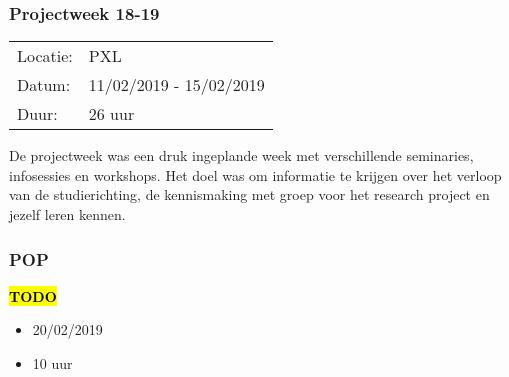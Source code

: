 \subsubsection{Projectweek 18-19}

\begin{tabular}{l l}
  Locatie: & PXL\\
  Datum: & 11/02/2019 - 15/02/2019\\
  Duur: & 26 uur
\end{tabular}

De projectweek was een druk ingeplande week met verschillende seminaries, infosessies en workshops. Het doel was om informatie te krijgen over het verloop van de studierichting, de kennismaking met groep voor het research project en jezelf leren kennen.

\subsubsection{POP\sessies}

\hl{\textbf{TODO}}

\begin{itemize}
  \item 20/02/2019
  \item 10 uur
\end{itemize}